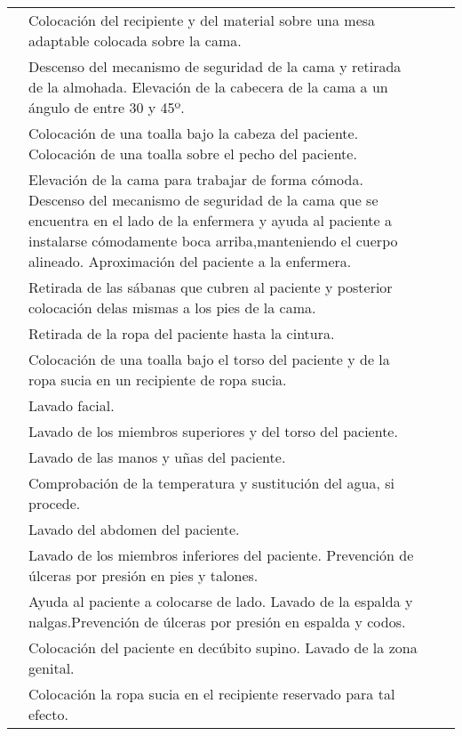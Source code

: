 \begin{landscape}
\begin{longtable}{N{0.15\textwidth}M{0.93\textwidth}|M{0.095\textwidth}M{0.22\textwidth}}
        & Colocación del recipiente y del material sobre una mesa adaptable colocada sobre la cama.
        & & \\  
        & Descenso del mecanismo de seguridad de la cama y retirada de la almohada. Elevación de la cabecera de la cama a un ángulo de entre 30 y 45º.
        & & \\  
        & Colocación de una toalla bajo la cabeza del paciente. Colocación de una toalla sobre el pecho del paciente.
        & & \\  
        & Elevación de la cama para trabajar de forma cómoda. Descenso del mecanismo de seguridad de la cama que se encuentra en el lado de la enfermera y ayuda al paciente a instalarse cómodamente boca arriba,manteniendo el cuerpo alineado. Aproximación del paciente a la enfermera.
        & & \\  
        & Retirada de las sábanas que cubren al paciente y posterior colocación delas mismas a los pies de la cama.
        & & \\  
        & Retirada de la ropa del paciente hasta la cintura.
        & & \\  
        & Colocación de una toalla bajo el torso del paciente y de la ropa sucia en un recipiente de ropa sucia.
        & & \\  
        & Lavado facial.
        & & \\ 
        & Lavado de los miembros superiores y del torso del paciente.
        & & \\  
        & Lavado de las manos y uñas del paciente.
        & & \\  
        & Comprobación de la temperatura y sustitución del agua, si procede.
        & & \\  
        & Lavado del abdomen del paciente.
        & & \\  
        & Lavado de los miembros inferiores del paciente. Prevención de úlceras por presión en pies y talones.
        & & \\  
        & Ayuda al paciente a colocarse de lado. Lavado de la espalda y nalgas.Prevención de úlceras por presión en espalda y codos.
        & & \\  
        & Colocación del paciente en decúbito supino. Lavado de la zona genital.
        & & \\  
        & Colocación la ropa sucia en el recipiente reservado para tal efecto.

\end{longtable}
\end{landscape}
